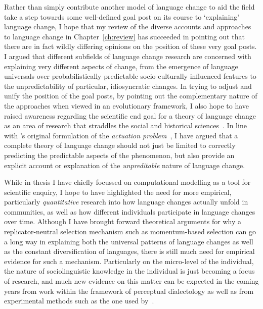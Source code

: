 
Rather than simply contribute another model of language change to aid the field take a step towards some well-defined goal post on its course to `explaining' language change, I hope that my review of the diverse accounts and approaches to language change in Chapter~\ref{ch:review} has succeeded in pointing out that there are in fact wildly differing opinions on the position of these very goal posts. I argued that different subfields of language change research are concerned with explaining very different aspects of change, from the emergence of language universals over probabilistically predictable socio-culturally influenced features to the unpredictability of particular, idiosyncratic changes.
In trying to adjust and unify the position of the goal posts, by pointing out the complementary nature of the approaches when viewed in an evolutionary framework, I also hope to have raised awareness regarding the scientific end goal for a theory of language change as an area of research that straddles the social and historical sciences~\citep{Blute1997}. In line with \citeauthor{Weinreich1968}'s original formulation of the \emph{actuation problem}~\citeyearpar{Weinreich1968}, I have argued that a complete theory of language change should not just be limited to correctly predicting the predictable aspects of the phenomenon, but also provide an explicit account or explanation of the \emph{unpreditable} nature of language change.

While in thesis I have chiefly focussed on computational modelling as a tool for scientific enquiry, I hope to have highlighted the need for more empirical, particularly \emph{quantitative} research into how language changes actually unfold in communities, as well as how different individuals participate in language changes over time.
Although I have brought forward theoretical arguments for why a replicator-neutral selection mechanism such as momentum-based selection can go a long way in explaining both the universal patterns of language changes as well as the constant diversification of languages, there is still much need for empirical evidence for such a mechanism. Particularly on the micro-level of the individual, the nature of sociolinguistic knowledge in the individual is just becoming a focus of research, and much new evidence on this matter can be expected in the coming years from work within the framework of perceptual dialectology as well as from experimental methods such as the one used by~\citet{Drager2011}.

